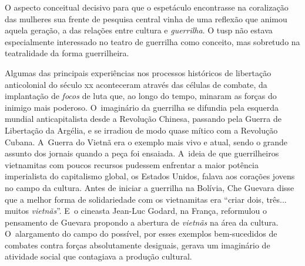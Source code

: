 {

\subject{Imaginário guerrilheiro}

O aspecto conceitual decisivo para que o espetáculo encontrasse na
coralização das mulheres sua frente de pesquisa central vinha de uma
reflexão que animou aquela geração, a das relações entre cultura e
{\it guerrilha}. O {\sc tusp} não estava especialmente interessado no
teatro de guerrilha como conceito, mas sobretudo na teatralidade
da forma guerrilheira.

Algumas das principais experiências nos processos históricos de
libertação anticolonial do século {\sc xx} aconteceram através das células de
combate, da implantação de {\it focos} de luta que, ao longo do tempo,
minaram as forças do inimigo mais poderoso. O~imaginário da
guerrilha se difundia pela esquerda mundial anticapitalista desde a
Revolução Chinesa, passando pela Guerra de Libertação da Argélia, e se
irradiou de modo quase mítico com a Revolução Cubana. A~Guerra do Vietnã
era o exemplo mais vivo e atual, sendo o grande assunto dos jornais
quando a peça foi ensaiada. A~ideia de que guerrilheiros vietnamitas com
poucos recursos pudessem enfrentar a maior potência imperialista do
capitalismo global, os Estados Unidos, falava aos corações jovens no
campo da cultura. Antes de iniciar a guerrilha na Bolívia, Che Guevara 
disse que a melhor forma de solidariedade com os vietnamitas era “criar
dois, três... muitos {\it vietnãs}”. E~o cineasta Jean-Luc Godard, na
França, reformulou o pensamento de Guevara propondo a abertura de
{\it vietnãs} na área da cultura. O~alargamento do campo do possível,
por esses exemplos bem-sucedidos de combates contra forças absolutamente
desiguais, gerava um imaginário de atividade social que contagiava a
produção cultural.

}
